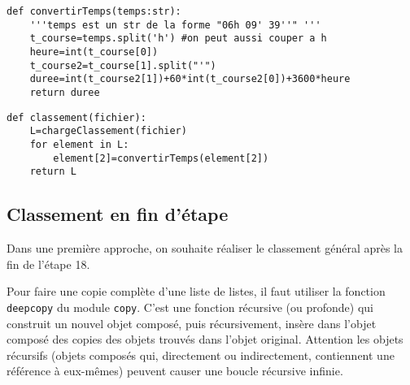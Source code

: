 \ifprof
\begin{lstlisting}
def convertirTemps(temps:str):
    '''temps est un str de la forme "06h 09' 39''" '''
    t_course=temps.split('h') #on peut aussi couper a h
    heure=int(t_course[0])
    t_course2=t_course[1].split("'")
    duree=int(t_course2[1])+60*int(t_course2[0])+3600*heure
    return duree
\end{lstlisting}
\else\fi



\ifprof
\begin{lstlisting}
def classement(fichier):
    L=chargeClassement(fichier)
    for element in L:
        element[2]=convertirTemps(element[2])
    return L
\end{lstlisting}
\else\fi


\subsection*{Classement en fin d'étape}
Dans une première approche, on souhaite réaliser le classement général après la fin de l'étape 18.

\begin{rem}
Pour faire une copie complète d'une liste de listes, il faut utiliser la fonction \texttt{deepcopy} du module \texttt{copy}. C'est une fonction récursive (ou profonde) qui construit un nouvel objet composé, puis récursivement, insère dans l'objet composé des copies des objets trouvés dans l'objet original. Attention les objets récursifs (objets composés qui, directement ou indirectement, contiennent une référence à eux-mêmes) peuvent causer une boucle récursive infinie.
\end{rem}

